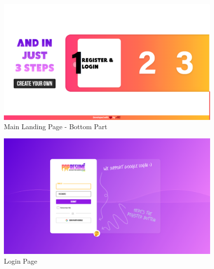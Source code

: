 \documentclass[12pt]{article}
\begin{document}
\begin{figure}[H]
\centering
\includegraphics[width=0.7\linewidth]{Screenshot (127).png}
\caption{Main Landing Page - Bottom Part}
\end{figure}

\begin{figure}[H]
\centering
\includegraphics[width=0.7\linewidth]{Screenshot (129).png}
\caption{Login Page}
\end{figure}
\end{document}
